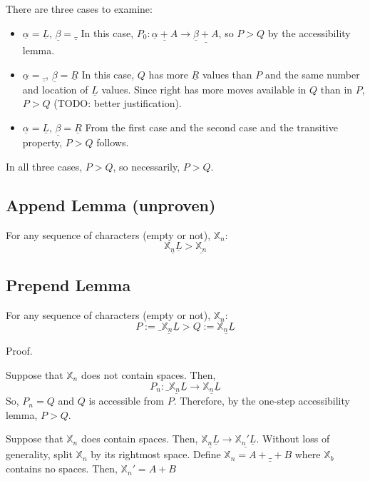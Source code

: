 \documentclass[11pt]{article}
\begin{document}
There are three cases to examine:
\begin{itemize}
\item \(\underline{\alpha} = \underline{L}\), \(\underline{\beta} = \underline{\_}\)
In this case, \(P_{0}: \underline{\underline{\alpha} + A} \to \underline{\underline{\beta} + A}\), so
\(P > Q\) by the accessibility lemma.

\item \(\underline{\alpha} = \underline{\_}\), \(\underline{\beta} = \underline{R}\)
In this case, \(Q\) has more \(\underline{R}\) values than \(P\) and the same number and location of \(\underline{L}\) values.
Since right has more moves available in \(Q\) than in \(P\), \(P > Q\) (TODO: better justification).

\item \(\underline{\alpha} = \underline{L}\), \(\underline{\beta} = \underline{R}\)
From the first case and the second case and the transitive property,
\(P > Q\) follows.
\end{itemize}

In all three cases, \(P > Q\), so necessarily, \(P > Q\).

\subsection*{Append Lemma (unproven)}
\label{sec:org27a06c3}
For any sequence of characters (empty or not), \(\mathbb{X}_{n}\):
$$\underline{\mathbb{X}_{n} \underline{L}} > \underline{\mathbb{X}_{n}}$$

\subsection*{Prepend Lemma}
\label{sec:org0dbbd71}
For any sequence of characters (empty or not), \(\mathbb{X}_{n}\):
$$P := \underline{\_ \mathbb{X}_{n} \underline{L}} > Q := \underline{\mathbb{X}_{n} \underline{L}}$$

Proof.

\bigskip

Suppose that \(\mathbb{X}_{n}\) does not contain spaces.
Then,
$$P_{n} : \underline{\_ \mathbb{X}_{n} \underline{L}} \to \underline{\mathbb{X}_{n} \underline{L}}$$
So, \(P_{n} = Q\) and \(Q\) is accessible from \(P\).
Therefore, by the one-step accessibility lemma, \(P > Q\).

\bigskip

Suppose that \(\mathbb{X}_{n}\) does contain spaces.
Then, \(\underline{\mathbb{X}_{n} \underline{L}} \to \underline{\mathbb{X}_{n}' \underline{L}}\).
Without loss of generality, split \(\mathbb{X}_{n}\) by its rightmost space.
Define \(\mathbb{X}_{n} = A + \underline{\_} + B\) where \(\mathbb{X}_{b}\) contains no spaces.
Then, \(\mathbb{X}_{n}' = A + B\)
\end{document}
